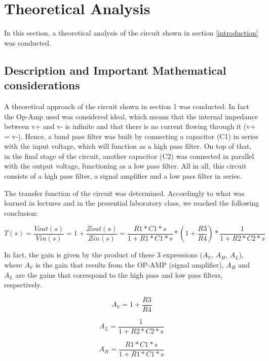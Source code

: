 \section{Theoretical Analysis} \label{section:theo}


\par In this section, a theoretical analysis of the circuit shown in section \ref{introduction} was conducted. 

\subsection{Description and Important Mathematical considerations}


A theoretical approach of the circuit shown in section 1 was conducted. In fact the Op-Amp used was considered ideal, which means that the internal impedance between v+ and v- is infinite and that there is no current flowing through it (v+ = v-). Hence, a band pass filter was built by connecting a capacitor (C1) in series with the input voltage, which will function as a high pass filter. On top of that, in the final stage of the circuit, another capacitor (C2) was connected in parallel with the output voltage, functioning as a low pass filter. All in all, this circuit consists of a high pass filter, a signal amplifier and a low pass filter in series. 


The transfer function of the circuit was determined. Accordingly to what was learned in lectures and in the presential laboratory class, we reached the following conclusion:

\begin{equation}
T(s)= \frac{Vout(s)}{Vin(s)}=1+\frac{Zout(s)}{Zin(s)} = \frac{R1*C1*s}{1+R1*C1*s}*(1+\frac{R3}{R4})*\frac{1}{1+R2*C2*s}
\end{equation}

In fact, the gain is given by the product of these 3 expressions ($A_{V}$, $A_{H}$, $A_{L}$), where $A_{V}$ is the gain that results from the OP-AMP (signal amplifier), $A_{H}$ and $A_{L}$ are the gains that correspond to the high pass and low pass filters, respectively.

\begin{equation}
A_{V}=  1+\frac{R3}{R4}
\end{equation}

\begin{equation}
A_{L}=  \frac{1}{1+R2*C2*s}
\end{equation}

\begin{equation}
A_{H}=  \frac{R1*C1*s}{1+R1*C1*s}
\end{equation}


